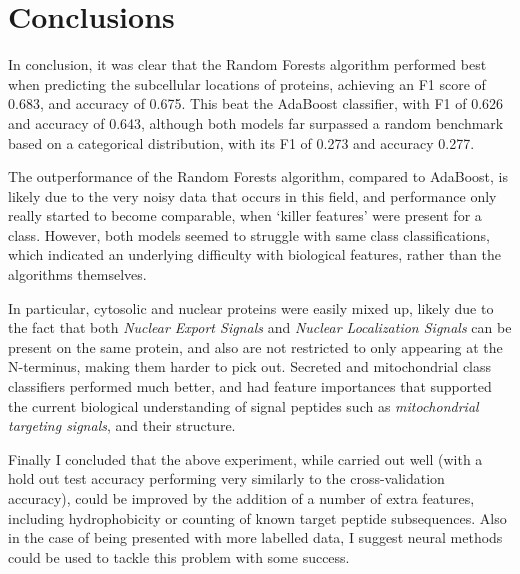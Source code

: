 \documentclass{bioinfo}
\begin{document}
\section{Conclusions}

In conclusion, it was clear that the Random Forests algorithm performed best when predicting the subcellular locations of proteins, achieving an F1 score of 0.683, and accuracy of 0.675. This beat the AdaBoost classifier, with F1 of 0.626 and accuracy of 0.643, although both models far surpassed a random benchmark based on a categorical distribution, with its F1 of 0.273 and accuracy 0.277. 

The outperformance of the Random Forests algorithm, compared to AdaBoost, is likely due to the very noisy data that occurs in this field, and performance only really started to become comparable, when `killer features' were present for a class. However, both models seemed to struggle with same class classifications, which indicated an underlying difficulty with biological features, rather than the algorithms themselves.

In particular, cytosolic and nuclear proteins were easily mixed up, likely due to the fact that both \textit{Nuclear Export Signals} and \textit{Nuclear Localization Signals} can be present on the same protein, and also are not restricted to only appearing at the N-terminus, making them harder to pick out. 
Secreted and mitochondrial class classifiers performed much better, and had feature importances that supported the current biological understanding of signal peptides such as \textit{mitochondrial targeting signals}, and their structure. 

Finally I concluded that the above experiment, while carried out well (with a hold out test accuracy performing very similarly to the cross-validation accuracy), could be improved by the addition of a number of extra features, including hydrophobicity or counting of known target peptide subsequences. Also in the case of being presented with more labelled data, I suggest neural methods could be used to tackle this problem with some success. 





\vspace*{-10pt}


\end{document}
